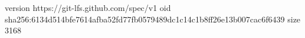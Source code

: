 version https://git-lfs.github.com/spec/v1
oid sha256:6134d514bfe7614afba52fd77fb0579489dc1c14c1b8ff26e13b007cac6f6439
size 3168
